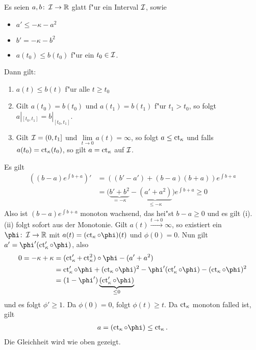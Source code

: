 \begin{Lemma}\label{thm:lemma-9-16}
  Es seien $a,b \colon \operatorname{\mathcal{I}} \to \operatorname{\mathbb{R}}$ glatt f"ur ein Interval $\operatorname{\mathcal{I}}$, sowie
  \begin{itemize}
  \item $a' \leq -\kappa - a^2$
  \item $b' = -\kappa - b^2$
  \item $a(t_0) \leq b(t_0)$ f"ur ein $t_0 \in \operatorname{\mathcal{I}}$.
  \end{itemize}
  Dann gilt:
  \begin{enumerate}[label=(\roman*)]
  \item $a(t) \leq b(t)$ f"ur alle $t \ge t_0$
  \item Gilt $a(t_0) = b(t_0)$ und $a(t_1) = b(t_1)$ f"ur $t_1 > t_0$, so folgt $a|_{[t_0,t_1]} = b|_{[t_0,t_1]}$.
  \item Gilt $\operatorname{\mathcal{I}} = (0,t_1]$ und $\lim\limits_{t \to 0}a(t) = \infty$, so folgt $a \leq \operatorname{ct}_{\kappa}$ und falls $a(t_0) = \operatorname{ct}_{\kappa}(t_0)$, so gilt $a = \operatorname{ct}_{\kappa}$ auf $\operatorname{\mathcal{I}}$.
  \end{enumerate}
\end{Lemma}

\begin{bew}
  Es gilt
  \begin{align*}
    \left((b-a)e^{\int b+a}\right)'
    & = \left((b'-a') + (b-a)(b+a)\right)e^{\int b+a} \\
    & = \big(\underbrace{b'+b^2}_{= -\kappa} - \underbrace{(a' + a^2)}_{\leq - \kappa}\big)e^{\int b+a}
    \geq 0
  \end{align*}
  Also ist $(b-a)e^{\int b+a}$ monoton wachsend, das hei"st $b-a \geq 0$ und es gilt (i). (ii) folgt sofort aus der Monotonie.
  Gilt $a(t) \xrightarrow{t\to 0} \infty$, so existiert ein $\phi \colon \calI \to \R$ mit $a(t) = (\ct_{\kappa}\circ \phi)(t)$ und $\phi(0) = 0$.
  Nun gilt $a' = \phi'(\ct'_{\kappa} \circ \phi)$, also
  \begin{align*}
    0 = -\kappa + \kappa
    & = (\ct'_{\kappa} + \ct_{\kappa}^2) \circ \phi - (a' + a^2)\\
    & = \ct'_{\kappa} \circ \phi + (\ct_{\kappa} \circ \phi)^2 - \phi'(\ct'_{\kappa} \circ \phi) - (\ct_{\kappa} \circ \phi)^2\\
    & = (1-\phi')\underbrace{(\ct'_{\kappa} \circ \phi)}_{\leq 0}
  \end{align*}
  und es folgt $\phi' \geq 1$.
  Da $\phi(0) = 0$, folgt $\phi(t) \geq t$.
  Da $\operatorname{ct}_{\kappa}$ monoton falled ist, gilt
  \begin{align*}
    a = (\ct_{\kappa} \circ \phi) \leq \ct_{\kappa}.
  \end{align*}
  Die Gleichheit wird wie oben gezeigt.
\end{bew}

